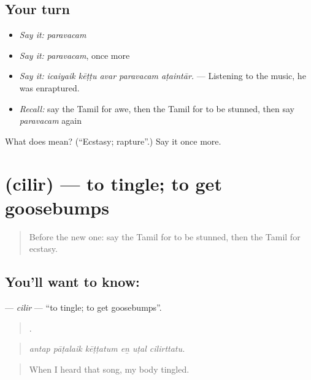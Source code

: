 \subsection*{Your turn}
\begin{itemize}
\raggedright
  \item \emph{Say it:} \emph{paravacam}
  \item \emph{Say it:} \emph{paravacam}, once more
  \item \emph{Say it:} \emph{icaiyaik kēṭṭu avar paravacam aṭaintār.} — Listening to the music, he was enraptured.
  \item \emph{Recall:} say the Tamil for awe, then the Tamil for to be stunned, then say \emph{paravacam} again
\end{itemize}

\begin{tcolorbox}[breakable,colback=teal!4,colframe=teal!35!black,title={Before you move on}]
What does  mean? (\textquotedblleft{}Ecstasy; rapture\textquotedblright{}.) Say it once more.
\end{tcolorbox}
\section[\texorpdfstring{\ta{சிலிர்} (cilir)}{சிலிர் (cilir)}]{ (cilir) — to tingle; to get goosebumps}

\label{lesson:TA-C460-cilir}



\begin{quote}
Before the new one: say the Tamil for to be stunned, then the Tamil for ecstasy.
\end{quote}

\subsection*{You'll want to know: }
\textbf{} — \emph{cilir} — \textquotedblleft{}to tingle; to get goosebumps\textquotedblright{}.

\begin{quote}
     .
\end{quote}

\begin{quote}
\emph{antap pāṭalaik kēṭṭatum eṉ uṭal cilirttatu.}
\end{quote}

\begin{quote}
When I heard that song, my body tingled.
\end{quote}

